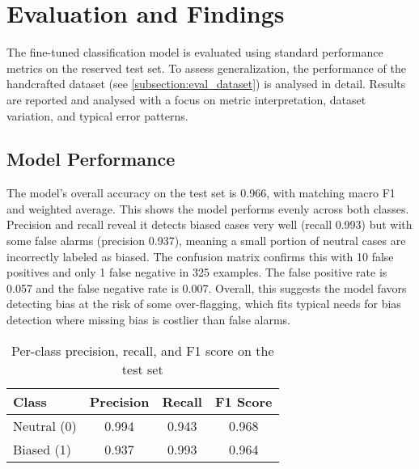 \chapter{Evaluation and Findings}
    The fine-tuned classification model is evaluated using standard performance metrics on the reserved test set. To assess generalization, the performance of the handcrafted dataset (see \autoref{subsection:eval_dataset}) is analysed in detail. Results are reported and analysed with a focus on metric interpretation, dataset variation, and typical error patterns.

\section{Model Performance}
    The model’s overall accuracy on the test set is 0.966, with matching macro F1 and weighted average. This shows the model performs evenly across both classes. Precision and recall reveal it detects biased cases very well (recall 0.993) but with some false alarms (precision 0.937), meaning a small portion of neutral cases are incorrectly labeled as biased. The confusion matrix confirms this with 10 false positives and only 1 false negative in 325 examples. The false positive rate is 0.057 and the false negative rate is 0.007. Overall, this suggests the model favors detecting bias at the risk of some over-flagging, which fits typical needs for bias detection where missing bias is costlier than false alarms.

        \vspace{0.8em}
        \begin{table}[H]
            \centering
            \begin{tabular}{lccc}
            \toprule
            \textbf{Class} & \textbf{Precision} & \textbf{Recall} & \textbf{F1 Score} \\
            \midrule
            Neutral (0) & 0.994 & 0.943 & 0.968 \\
            Biased (1)  & 0.937 & 0.993 & 0.964 \\
            \bottomrule
            \end{tabular}
            \caption{Per-class precision, recall, and F1 score on the test set}
        \end{table}

